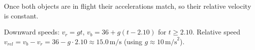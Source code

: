 \begin{answerbox}
\end{answerbox}
\begin{insightbox}
Once both objects are in flight their accelerations match, so their relative velocity is constant.
\end{insightbox}
\begin{solutionbox}

Downward speeds: $v_r=gt$, $v_b=36+g(t-2.10)$ for $t\ge2.10$. Relative speed $v_{rel}=v_b-v_r=36-g\cdot2.10\approx15.0\,\text{m/s}$ (using $g\approx10\,\text{m/s}^2$).
\end{solutionbox}
